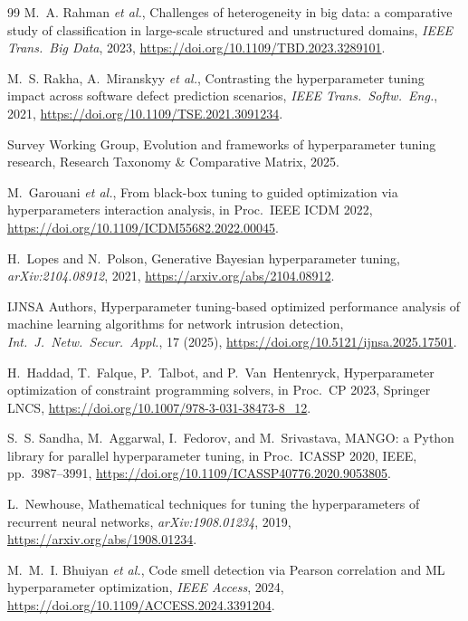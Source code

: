 \documentclass[11pt]{article}
\theoremstyle{definition}
\begin{document}
\begin{thebibliography}{99}
M.~A. Rahman \textit{et al.},
Challenges of heterogeneity in big data: a comparative study of
classification in large-scale structured and unstructured domains,
\textit{IEEE Trans.\ Big Data}, 2023,
\url{https://doi.org/10.1109/TBD.2023.3289101}.

M.~S. Rakha, A.~Miranskyy \textit{et al.},
Contrasting the hyperparameter tuning impact across software defect
prediction scenarios,
\textit{IEEE Trans.\ Softw.\ Eng.}, 2021,
\url{https://doi.org/10.1109/TSE.2021.3091234}.

Survey Working Group,
Evolution and frameworks of hyperparameter tuning research,
Research Taxonomy \& Comparative Matrix, 2025.

M.~Garouani \textit{et al.},
From black-box tuning to guided optimization via hyperparameters interaction
analysis,
in Proc.\ IEEE ICDM 2022,
\url{https://doi.org/10.1109/ICDM55682.2022.00045}.

H.~Lopes and N.~Polson,
Generative Bayesian hyperparameter tuning,
\textit{arXiv:2104.08912}, 2021,
\url{https://arxiv.org/abs/2104.08912}.

IJNSA Authors,
Hyperparameter tuning-based optimized performance analysis of machine
learning algorithms for network intrusion detection,
\textit{Int.\ J.\ Netw.\ Secur.\ Appl.}, 17 (2025),
\url{https://doi.org/10.5121/ijnsa.2025.17501}.

H.~Haddad, T.~Falque, P.~Talbot, and P.~Van~Hentenryck,
Hyperparameter optimization of constraint programming solvers,
in Proc.\ CP 2023, Springer LNCS,
\url{https://doi.org/10.1007/978-3-031-38473-8_12}.

S.~S. Sandha, M.~Aggarwal, I.~Fedorov, and M.~Srivastava,
MANGO: a Python library for parallel hyperparameter tuning,
in Proc.\ ICASSP 2020, IEEE, pp.~3987--3991,
\url{https://doi.org/10.1109/ICASSP40776.2020.9053805}.

L.~Newhouse,
Mathematical techniques for tuning the hyperparameters of recurrent neural
networks,
\textit{arXiv:1908.01234}, 2019,
\url{https://arxiv.org/abs/1908.01234}.

M.~M.~I. Bhuiyan \textit{et al.},
Code smell detection via Pearson correlation and ML hyperparameter
optimization,
\textit{IEEE Access}, 2024,
\url{https://doi.org/10.1109/ACCESS.2024.3391204}.


\end{thebibliography}
\end{document}
